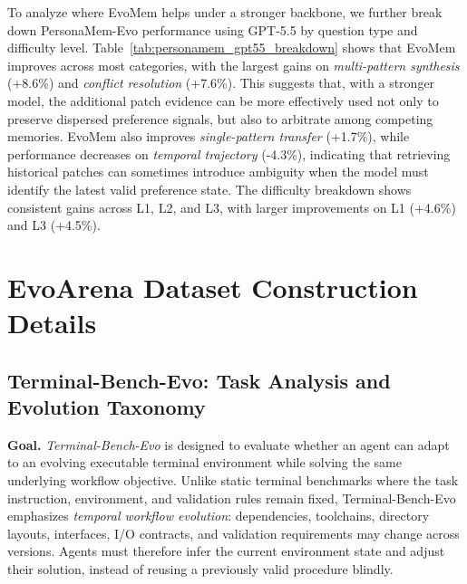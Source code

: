 \documentclass{llmxive}
\begin{document}
To analyze where EvoMem helps under a stronger backbone, we further break down PersonaMem-Evo performance using GPT-5.5 by question type and difficulty level. Table~\ref{tab:personamem_gpt55_breakdown} shows that EvoMem improves across most categories, with the largest gains on \emph{multi-pattern synthesis} (+8.6\%) and \emph{conflict resolution} (+7.6\%). This suggests that, with a stronger model, the additional patch evidence can be more effectively used not only to preserve dispersed preference signals, but also to arbitrate among competing memories. EvoMem also improves \emph{single-pattern transfer} (+1.7\%), while performance decreases on \emph{temporal trajectory} (-4.3\%), indicating that retrieving historical patches can sometimes introduce ambiguity when the model must identify the latest valid preference state. The difficulty breakdown shows consistent gains across L1, L2, and L3, with larger improvements on L1 (+4.6\%) and L3 (+4.5\%).










\section{EvoArena Dataset Construction Details}













\subsection{Terminal-Bench-Evo: Task Analysis and Evolution Taxonomy}
\label{app:terminal}
\label{app:terminal_analysis}

\textbf{Goal.}
\emph{Terminal-Bench-Evo} is designed to evaluate whether an agent can adapt to an evolving executable terminal environment while solving the same underlying workflow objective. Unlike static terminal benchmarks where the task instruction, environment, and validation rules remain fixed, Terminal-Bench-Evo emphasizes \emph{temporal workflow evolution}: dependencies, toolchains, directory layouts, interfaces, I/O contracts, and validation requirements may change across versions. Agents must therefore infer the current environment state and adjust their solution, instead of reusing a previously valid procedure blindly.
\end{document}
